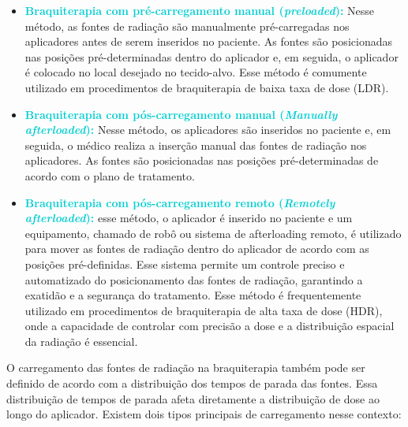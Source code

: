 \documentclass[11pt,a4paper]{article}
\begin{document}
			\begin{itemize}
				\item \textcolor{DarkTurquoise}{\textbf{Braquiterapia com pré-carregamento manual (\textit{preloaded}):}} Nesse método, as fontes de radiação são manualmente pré-carregadas nos aplicadores antes de serem inseridos no paciente. As fontes são posicionadas nas posições pré-determinadas dentro do aplicador e, em seguida, o aplicador é colocado no local desejado no tecido-alvo. Esse método é comumente utilizado em procedimentos de braquiterapia de baixa taxa de dose (LDR).
				
				\item \textcolor{DarkTurquoise}{\textbf{Braquiterapia com pós-carregamento manual (\textit{Manually afterloaded}):}} Nesse método, os aplicadores são inseridos no paciente e, em seguida, o médico realiza a inserção manual das fontes de radiação nos aplicadores. As fontes são posicionadas nas posições pré-determinadas de acordo com o plano de tratamento.
				
				\item \textcolor{DarkTurquoise}{\textbf{Braquiterapia com pós-carregamento remoto (\textit{Remotely afterloaded}):}} esse método, o aplicador é inserido no paciente e um equipamento, chamado de robô ou sistema de afterloading remoto, é utilizado para mover as fontes de radiação dentro do aplicador de acordo com as posições pré-definidas. Esse sistema permite um controle preciso e automatizado do posicionamento das fontes de radiação, garantindo a exatidão e a segurança do tratamento. Esse método é frequentemente utilizado em procedimentos de braquiterapia de alta taxa de dose (HDR), onde a capacidade de controlar com precisão a dose e a distribuição espacial da radiação é essencial.
			\end{itemize}

			O carregamento das fontes de radiação na braquiterapia também pode ser definido de acordo com a distribuição dos tempos de parada das fontes. Essa distribuição de tempos de parada afeta diretamente a distribuição de dose ao longo do aplicador. Existem dois tipos principais de carregamento nesse contexto:
		
\end{document}
